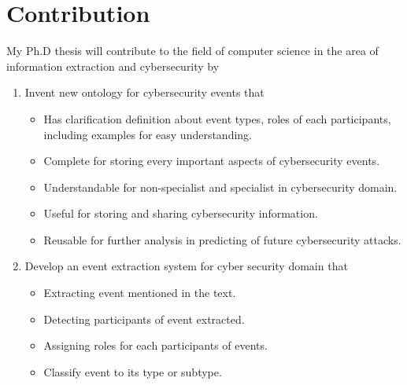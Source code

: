 \section{Contribution}
\label{contribution}
My Ph.D thesis will contribute to the field of computer science in the area of information extraction and cybersecurity by 
\begin{enumerate}

    \item Invent new ontology for cybersecurity events that
    
    \begin{itemize}
        \item Has clarification definition about event types, roles of each participants, including examples for easy understanding.
        \item Complete for storing every important aspects of cybersecurity events.
        \item Understandable for non-specialist and specialist in cybersecurity domain.
        \item Useful for storing and sharing cybersecurity information.
        \item Reusable for further analysis in predicting of future cybersecurity attacks.    
    \end{itemize}
    \item Develop an event extraction system for cyber security domain that
    \begin{itemize}
        \item Extracting event mentioned in the text.
        \item Detecting participants of event extracted.
        \item Assigning roles for each participants of events.
        \item Classify event to its type or subtype.

    \end{itemize}
\end{enumerate}
 


